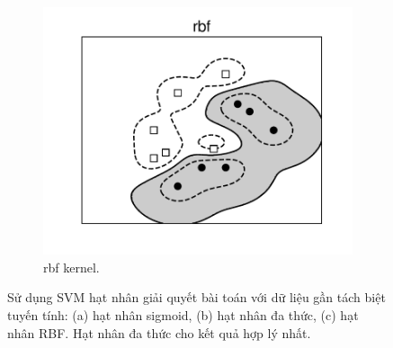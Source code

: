\begin{figure}[t]
    \begin{subfigure}{0.325\textwidth}
    \includegraphics[width=\linewidth]{Chapters/09_SupportVectorMachines/21_kernelsvm/plt/rbf3.pdf}
    \caption{rbf kernel.}
    \end{subfigure}

    \caption{
    Sử dụng SVM hạt nhân giải quyết bài toán với dữ liệu {gần tách biệt
    tuyến tính}: (a) hạt nhân sigmoid, (b) hạt nhân đa thức, (c) hạt nhân RBF. Hạt nhân đa thức cho kết quả hợp lý nhất. }
    \label{fig:21_3}
\end{figure}
 
 
 
 
 
